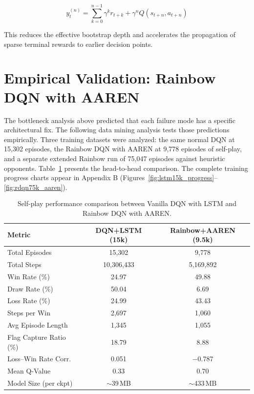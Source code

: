 \begin{equation}
y_t^{(n)} = \sum_{k=0}^{n-1} \gamma^k r_{t+k} + \gamma^n Q(s_{t+n}, a_{t+n})
\end{equation}

This reduces the effective bootstrap depth and accelerates the propagation of sparse terminal rewards to earlier decision points.


\section{Empirical Validation: Rainbow DQN with AAREN}

The bottleneck analysis above predicted that each failure mode has a specific architectural fix. The following data mining analysis tests those predictions empirically. Three training datasets were analyzed: the same normal DQN at 15,302 episodes, the Rainbow DQN with AAREN at 9,778 episodes of self-play, and a separate extended Rainbow run of 75,047 episodes against heuristic opponents. Table~\ref{tab:arch_comparison} presents the head-to-head comparison. The complete training progress charts appear in Appendix B (Figures~\ref{fig:lstm15k_progress}--\ref{fig:rdqn75k_aaren}).

\begin{table}[htbp]
\centering
\caption{Self-play performance comparison between Vanilla DQN with LSTM and Rainbow DQN with AAREN.}
\label{tab:arch_comparison}
\begin{tabular}{l c c}
\hline
\textbf{Metric} & \textbf{DQN+LSTM (15k)} & \textbf{Rainbow+AAREN (9.5k)} \\ \hline
Total Episodes         & 15,302   & 9,778    \\
Total Steps            & 10,306,433 & 5,169,892 \\
Win Rate (\%)          & 24.97    & 49.88    \\
Draw Rate (\%)         & 50.04    & 6.69     \\
Loss Rate (\%)         & 24.99    & 43.43    \\
Steps per Win          & 2,697    & 1,060    \\
Avg Episode Length     & 1,345    & 1,055    \\
Flag Capture Ratio (\%)& 18.79   & 8.88     \\
Loss--Win Rate Corr.   & 0.051   & $-$0.787 \\
Mean Q-Value           & 0.33    & 0.70     \\
Model Size (per ckpt)  & $\sim$39\,MB & $\sim$433\,MB \\
\hline
\end{tabular}
\end{table}

